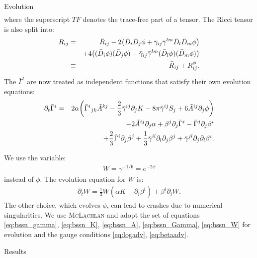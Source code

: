 \documentclass[noamssymb]{beamer}
\newlength{\colwidth}
\begin{document}
\begin{frame}[t]
\begin{columns}[t]
\begin{column}{\colwidth}
\begin{block}{Evolution}
\begin{eqnarray}
  	\end{eqnarray}
  	where the superscript $TF$ denotes the trace-free part of a tensor. The Ricci tensor is also split into:
  	\begin{eqnarray}
  		R_{ij}
  		&=& \bar{R}_{ij} - 2 \qty(\bar{D}_i\bar{D}_j \phi + \bar{\gamma}_{ij}\bar{\gamma}^{lm}\bar{D}_l \bar{D}_m \phi)\nonumber\\&&+4\qty((\bar{D}_i \phi)(\bar{D}_j \phi) - \bar{\gamma}_{ij}\bar{\gamma}^{lm}(\bar{D}_l \phi)(\bar{D}_m \phi) )\nonumber\\
  		&\equiv& \bar{R}_{ij} + R^\phi_{ij}.
  	\end{eqnarray}
  	The $\bar{\Gamma}^{i}$ are now treated as independent functions that satisfy their own evolution equations:
  	\begin{eqnarray}
  		\label{eq:bssn_Gamma}
  		\partial_t \bar{\Gamma}^i &=& 2\alpha \qty(\bar{\Gamma}^i{}_{jk} \tilde{A}^{kj} - \frac{2}{3}\bar{\gamma}^{ij}\partial_j K - 8\pi \bar{\gamma}^{ij} S_j + 6\tilde{A}^{ij}\partial_j \phi) \nonumber\\&& -2\tilde{A}^{ij}\partial_j \alpha + \beta^j \partial_j \bar{\Gamma}^i - \bar{\Gamma}^j \partial_j \beta^i \nonumber\\&&+ \frac{2}{3}\bar{\Gamma}^i \partial_j \beta^j + \frac{1}{3}\bar{\gamma}^{il}\partial_l \partial_j \beta^j + \bar{\gamma}^{jl}\partial_j\partial_l\beta^i.
  	\end{eqnarray}

  	We use the variable:
  	\begin{eqnarray}
  		W = \gamma^{-1/6} = e^{-2\phi}
  	\end{eqnarray}
  	instead of $\phi$. The evolution equation for $W$ is:
  	\begin{eqnarray}
  		\label{eq:bssn_W}
  		\partial_t W = \frac{1}{3}W(\alpha K - \partial_i \beta^i)+\beta^i \partial_i W.
  	\end{eqnarray}
  	The other choice, which evolves $\phi$, can lead to crashes due to numerical singularities.
  	We use \textsc{McLachlan} \cite{Brown:2008sb, Kranc:web, McLachlan:web} and adopt the set of equations \eqref{eq:bssn_gamma}, \eqref{eq:bssn_K}, \eqref{eq:bssn_A}, \eqref{eq:bssn_Gamma}, \eqref{eq:bssn_W} for evolution and the gauge conditions \eqref{eq:logadv}, \eqref{eq:betaadv}.



  \end{block}

  \begin{block}{Results}


\end{block}
\end{column}
\end{columns}
\end{frame}
\end{document}
